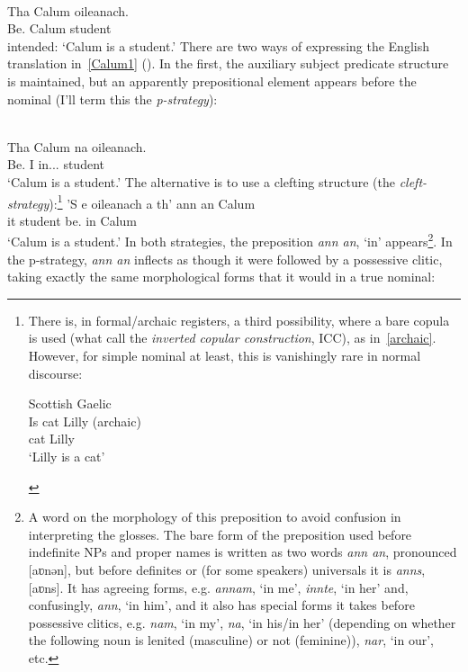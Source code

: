 \documentclass[output=paper]{langsci/langscibook}
\begin{document}
\ea {}\\
    \gll * Tha  Calum  oileanach.\\
        {} Be.\Prs{}  Calum student \\
    \glt {} intended: `Calum is a student.'\label{Calum1}
\z
There are two ways of expressing the English translation in~\eqref{Calum1}
(\citealt{cram:83,schreiner:15}). In the first, the auxiliary
subject predicate structure is maintained,  but an apparently prepositional
element appears before the nominal (I'll term this the \textit{p-strategy}):\newpage

\ea {}\\
\gll Tha  Calum  na  oileanach.\\
Be.\Prs{}  I  in.\Poss{}.\Tsg{}.\M{}  student \\
\glt \enquote*{Calum is a student.}
\z
The alternative is to use a clefting structure (the \textit{cleft-strategy}):\footnote{\label{icc}There is,
    in formal/archaic registers, a
    third possibility, where a bare copula is used (what
    \citealt{adger-ramchand:03} call the \textit{inverted copular construction}, ICC),
    as in~\eqref{archaic}. However, for simple nominal  at least, this
    is vanishingly rare in normal discourse:

\begin{exe}\label{archaic}
    Scottish Gaelic\\
\gll Is cat Lilly \hfill (archaic)\\
\Cop{} cat Lilly\\
\glt \enquote*{Lilly is a cat}
\end{exe}}
\ea
\gll 'S e oileanach a th' {ann an} Calum\\
\Cop{} it student \Rel{} be.\Prs{} in Calum\\
\glt \enquote*{Calum is a student.}
\z
In both strategies, the preposition \emph{ann an}, `in' appears\footnote{A word
on the morphology of this preposition to avoid confusion in interpreting the
glosses. The bare form of the preposition used before indefinite NPs and proper
names is written as two words \emph{ann an}, pronounced [aʋnən], but
before definites or (for some speakers) universals it is \emph{anns}, [aʋns].
It has agreeing forms, e.g. \emph{annam}, `in me', \emph{innte},
`in her' and, confusingly, \emph{ann}, `in him', and it also has special forms
it takes before possessive clitics, e.g. \emph{nam}, `in my', \emph{na}, `in
his/in her' (depending on whether the following noun is lenited (masculine) or
not (feminine)), \emph{nar}, `in our', etc.}. In the p-strategy, \emph{ann an}
inflects as though it were followed by a possessive clitic, taking exactly the
same morphological forms that it would in a true nominal:
\end{document}
